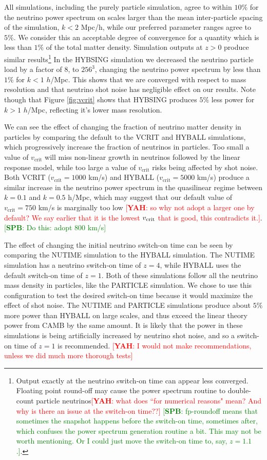 \documentclass[useAMS, usenatbib]{mnras}
\newcommand{\spb}[1]{{\textcolor{green}{[{\bf SPB}: #1]}}}
\newcommand{\yah}[1]{{\textcolor{red}{[{\bf YAH}: #1]}}}
\begin{document}
All simulations, including the purely particle simulation, agree to within $10\%$ for the neutrino power spectrum on scales larger than the mean inter-particle spacing of the simulation, $k < 2$ Mpc/h, while our preferred parameter ranges agree to $5\%$. We consider this an acceptable degree of convergence for a quantity which is less than $1\%$ of the total matter density. Simulation outputs at $z > 0$ produce similar results\footnote{Output exactly at the neutrino switch-on time can appear less converged. Floating point round-off may cause the power spectrum routine to double-count particle neutrinos\yah{what does ``for numerical reasons" mean? And why is there an issue at the switch-on time??} \spb{fp-roundoff means that sometimes the snapshot happens before the switch-on time, sometimes after, which confuses the power spectrum generation routine a bit. This may not be worth mentioning. Or I could just move the switch-on time to, say, $z=1.1$.}.} In the HYBSING simulation we decreased the neutrino particle load by a factor of $8$, to $256^3$, changing the neutrino power spectrum by less than $1\%$ for $k < 1$ $h$/Mpc. This shows that we are converged with respect to mass resolution and that neutrino shot noise has negligible effect on our results. Note though that Figure \ref{fig:vcrit} shows that HYBSING produces $5\%$ less power for $k > 1$ $h$/Mpc, reflecting it's lower mass resolution.

We can see the effect of changing the fraction of neutrino matter density in particles by comparing the default to the VCRIT and HYBALL simulations, which progressively increase the fraction of neutrinos in particles. Too small a value of $v_\mathrm{crit}$ will miss non-linear growth in neutrinos followed by the linear response model, while too large a value of $v_\mathrm{crit}$ risks being affected by shot noise. Both VCRIT ($v_\mathrm{crit} = 1000$ km/s) and HYBALL ($v_\mathrm{crit} = 5000$ km/s) produce a similar increase in the neutrino power spectrum in the quasilinear regime between $k = 0.1$ and $k = 0.5$ h/Mpc, which may suggest that our default value of $v_\mathrm{crit} = 750$ km/s is marginally too low \yah{so why not adopt a larger one by default? We say earlier that it is the lowest $v_{\rm crit}$ that is good, this contradicts it.}. \spb{Do this: adopt 800 km/s}

The effect of changing the initial neutrino switch-on time can be seen by comparing the NUTIME simulation to the HYBALL simulation.
The NUTIME simulation has a neutrino switch-on time of $z=4$, while HYBALL uses the default switch-on time of $z=1$. Both of these simulations follow all the neutrino mass density in particles, like the PARTICLE simulation. We chose to use this configuration to test the desired switch-on time because it would maximize the effect of shot noise. The NUTIME and PARTICLE simulations produce about $5\%$ more power than HYBALL on large scales, and thus exceed the linear theory power from CAMB by the same amount. It is likely that the power in these simulations is being artificially increased by neutrino shot noise, and so a switch-on time of $z=1$ is recommended. \yah{I would not make recommendations, unless we did much more thorough tests}
\end{document}
